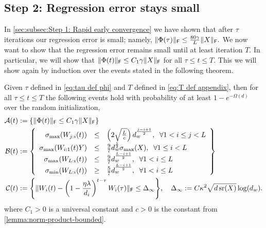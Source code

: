 \subsection{Step 2: Regression error stays small}
\label{sec:subsec:Step 2: he error stays small}
In \cref{sec:subsec:Step 1: Rapid early convergence} we have shown that after $\tau$ iterations our regression error is small; namely,
$
  \lVert\Phi(\tau)\rVert_{\mathsf{F}} \leq \frac{80 \gamma}{L} \lVert X\rVert_{\mathsf{F}}.
$
We now want to show that the regression error remains small until at least iteration $T$.
In particular, we will show that
$
  \lVert\Phi(t)\rVert_{\mathsf{F}} \leq C_1 \gamma\lVert X\rVert_{\mathsf{F}}
$
for all $\tau \leq t \leq T$.
This we will show again by induction over the events stated in the following theorem.
\begin{theorem}\label{thm:step2-induction}
 Given $\tau$ defined in \eqref{eq:tau def phi} and $T$ defined in \eqref{eq:T def appendix}, then for all $\tau \leq t \leq T$ the following events hold with probability of at least $1-e^{-\Omega(d)}$ over the random initialization,
    \begin{subequations}
	\begin{align}
    \cA(t) & := \set*{\frobnorm{\Phi(t)} \leq C_1\gamma\frobnorm{X}}
		\label{eq:induction-a} \\
		\cB(t) & := \left\{ \begin{array}{rclrr}
			            \sigma_{\max}(W_{j:i}(t))   & \leq & \left( 2\sqrt{\frac{L}{c}} \right) d_w^{\frac{j-i+1}{2}}, \;\; \forall 1 < i \leq j < L                 \\
			            \sigma_{\max}(W_{i:1}(t) Y)  & \leq & \frac{9}{7} d_w^{\frac{i}{2}} \sigma_{\max}(X),  \;\; \forall 1 \leq i < L\\
                        \sigma_{\max}(W_{L:i}(t) ) &\leq& \frac{9}{7} d_w^{\frac{L-i+1}{2}} , \;\; \forall 1 < i \leq  L\\
                        \sigma_{\min}(W_{L:i}(t) ) & \geq& \frac{5}{7} d_w^{\frac{L-i+1}{2}}  , \;\; \forall 1 < i \leq  L
                        \end{array} \right\} \label{eq:induction-b} \\
      \cC(t) & := \set*{
        \frobnorm{W_{i}(t) - \left(1 - \frac{\eta \lambda}{d_i}\right)^{t - \tau} W_{i}(\tau)}
        \leq \Delta_{\infty}
      },
      \quad
      \Delta_{\infty} := C \kappa^2 \sqrt{\dout \sr(X)} \log(\dhid) .
      \label{eq:induction-d-after-tao}
	\end{align}
\end{subequations}
where $C_1 > 0$ is a universal constant and $c>0$ is the constant from \cref{lemma:norm-product-bounded}.
\end{theorem}
